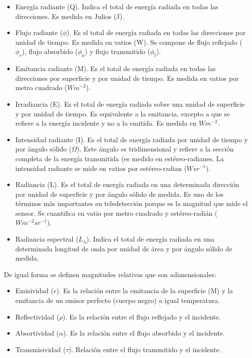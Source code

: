 \begin{itemize}
	\item Energía radiante (Q). Indica el total de energía radiada en todas las direcciones. Es medida en Julios (J).
	\item Flujo radiante ($\phi$). Es el total de energía radiada en todas las direcciones por unidad de tiempo. Es medida en vatios (W). Se compone de flujo reflejado ($\phi_{r}$), flujo absorbido ($\phi_{a}$) y flujo transmitido ($\phi_{t}$).
	\item Emitancia radiante (M). Es el total de energía radiada en todas las direcciones por superficie y por unidad de tiempo. Es medida en vatios por metro cuadrado ($Wm^{-2}$).
	\item Irradiancia (E). Es el total de energía radiada sobre una unidad de superficie y por unidad de tiempo. Es equivalente a la emitancia, excepto a que se refiere a la energía incidente y no a la emitida. Es medida en $Wm^{-2}$.
	\item Intensidad radiante (I). Es el total de energía radiada por unidad de tiempo y por ángulo sólido ($\Omega$). Este ángulo es tridimensional y refiere a la sección completa de la energía transmitida (es medido en estéreo-radianes. La intensidad radiante se mide en vatios por estéreo-radian ($Wsr^{-1}$).
	\item Radiancia (L). Es el total de energía radiada en una determinada dirección por unidad de superficie y por ángulo sólido de medida. Es uno de los términos más importantes en teledetección porque es la magnitud que mide el sensor. Se cuantifica en vatio por metro cuadrado y estéreo-radián ($Wm^{-2}sr^{-1}$).
	\item Radiancia espectral ($L_{\lambda}$). Indica el total de energía radiada en una determinada longitud de onda por unidad de área y por ángulo sólido de medida.
\end{itemize}

De igual forma se definen magnitudes relativas que son adimensionales:

\begin{itemize}
	\item Emisividad ($\epsilon$). Es la relación entre la emitancia de la superficie (M) y la emitancia de un emisor perfecto (cuerpo negro) a igual temperatura.
	\item Reflectividad ($\rho$). Es la relación entre el flujo reflejado y el incidente.
	\item Absortividad ($\alpha$). Es la relación entre el flujo absorbido y el incidente.
	\item Transmisividad ($\tau$). Relación entre el flujo transmitido y el incidente.
\end{itemize}

